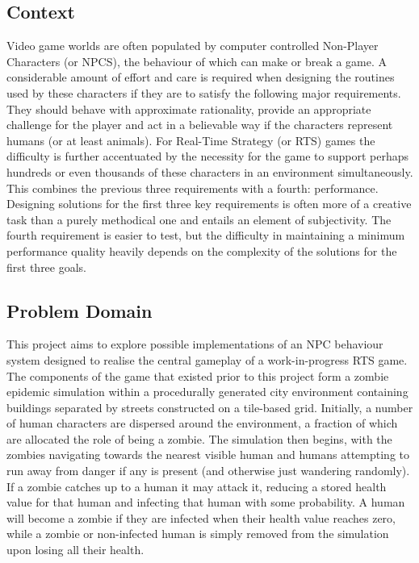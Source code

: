 \documentclass[a4paper,12pt]{article}
\begin{document}
\subsection{Context}\noindent
Video game worlds are often populated by computer controlled Non-Player Characters (or NPCS), the behaviour of which can make or break a game. A considerable amount of effort and care is required when designing the routines used by these characters if they are to satisfy the following major requirements. They should behave with approximate rationality, provide an appropriate challenge for the player and act in a believable way if the characters represent humans (or at least animals). For Real-Time Strategy (or RTS) games the difficulty is further accentuated by the necessity for the game to support perhaps hundreds or even thousands of these characters in an environment simultaneously. This combines the previous three requirements with a fourth: performance. Designing solutions for the first three key requirements is often more of a creative task than a purely methodical one and entails an element of subjectivity. The fourth requirement is easier to test, but the difficulty in maintaining a minimum performance quality heavily depends on the complexity of the solutions for the first three goals.

\subsection{Problem Domain}\noindent
This project aims to explore possible implementations of an NPC behaviour system designed to realise the central gameplay of a work-in-progress RTS game. The components of the game that existed prior to this project form a zombie epidemic simulation within a procedurally generated city environment containing buildings separated by streets constructed on a tile-based grid. Initially, a number of human characters are dispersed around the environment, a fraction of which are allocated the role of being a zombie. The simulation then begins, with the zombies navigating towards the nearest visible human and humans attempting to run away from danger if any is present (and otherwise just wandering randomly). If a zombie catches up to a human it may attack it, reducing a stored health value for that human and infecting that human with some probability. A human will become a zombie if they are infected when their health value reaches zero, while a zombie or non-infected human is simply removed from the simulation upon losing all their health.
\end{document}

